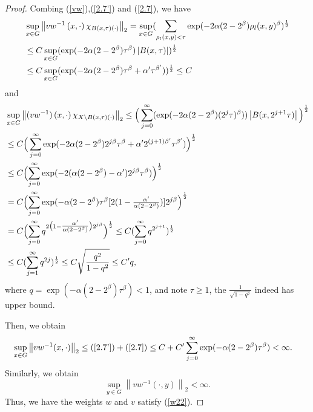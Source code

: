 \documentclass[preprint,11pt]{elsarticle}
\numberwithin{equation}{section}
\begin{document}
\begin{proof}
		\noindent Combing  (\ref{vw}),(\ref{2.7'}) and (\ref{2.7}), we have
		\begin{align*}%
			&	\sup_{x\in G}\left \| vw^{-1}\left ( x,\cdot \right )\chi _{B\left ( x,\tau  \right )\left ( \cdot  \right )  }  \right \|_{2}= \sup_{x\in G}(\sum _{\rho_{l}(x,y)< \tau }\exp(-2\alpha (2-2^{\beta })\rho_{l }(x,y)^{\beta })^\frac{1}{2}\notag\\
			&\le C\sup_{x\in G}(\exp(-2\alpha (2-2^{\beta })\tau ^{\beta})\left| B(x,\tau)\right|)^\frac{1}{2}\notag\\
			&\le C\sup_{x\in G}(\exp(-2\alpha (2-2^{\beta })\tau ^{\beta}+\alpha'\tau^{\beta'}))^\frac{1}{2}\le C
		\end{align*}
		and
		\begin{align}\label{sub-2.52}
			&\sup_{x\in G}\left \| (vw^{-1})\left ( x,\cdot \right )\chi _{X\setminus B\left ( x,\tau  \right )\left ( \cdot  \right )  }  \right \|_{2}\leq\Big(\sum_{j=0}^{\infty} (\exp (-2\alpha (2-2^{\beta})(2^{j}\tau)^{\beta})) \left| B(x,2^{j+1}\tau)\right|\Big)^\frac{1}{2} \notag \\
			&\leq C\Big(\sum_{j=0}^{\infty } \exp(-2\alpha(2-2^{\beta}) 2^{j\beta}\tau^{\beta }+\alpha'2^{(j+1)\beta'}\tau ^{\beta'} )\Big)^\frac{1}{2}\notag \\
			&\leq C\Bigl(\sum_{j=0}^{\infty }\exp( -2(\alpha(2-2^{\beta}) -\alpha')2^{j\beta}\tau^{\beta} )\Bigr)^{\frac{1}{2}}\notag \\
			&=C \Bigl(\sum_{j=0}^{\infty }\exp(-\alpha(2-2^\beta)\tau^\beta[2(1-\tfrac{\alpha'}{\alpha(2-2^{\beta})})]2^{j\beta} \Bigr)^{\frac{1}{2}} \notag\\
			&=C \Bigl(\sum_{j=0}^\infty q^{2\bigl(1-\tfrac{\alpha'}{\alpha(2-2^{\beta})}\bigr)2^{j\beta}}\Bigr)^{\frac{1}{2}}\leq C  (\sum_{j=0}^\infty q^{2^{j+1}})^{\frac{1}{2}} \notag \\
			&\leq C (\sum_{j=1}^{\infty}q^{2j}  )^{\frac{1}{2}}\leq C\sqrt{\frac{q^2}{1-q^2}}\leq C'q ,
		\end{align}
		where $q=\exp(-\alpha(2-2^{\beta})\tau^\beta)<1$, and note $\tau\geq 1$, the $\frac{1}{\sqrt{1-q^2}}$ indeed has upper bound.
		
		Then, we obtain 
		\begin{align*}
			\sup_{x\in G}\left \| vw^{-1}(x,\cdot ) \right\| _{2}\le (\ref{2.7'})+(\ref{2.7})
			&\le C+C'\sum_{j=0}^{\infty } \exp(-\alpha(2-2^{\beta}) \tau^{\beta } )<\infty.
		\end{align*}
		Similarly, we  obtain 
		\begin{equation*}
			\sup_{y\in G}\left \| vw^{-1}(\cdot,y ) \right \| _{2}<\infty.
		\end{equation*}
		Thus, we have the weights $w$ and $v$ satisfy (\ref{w22}).
		

\end{proof}
\end{document}
